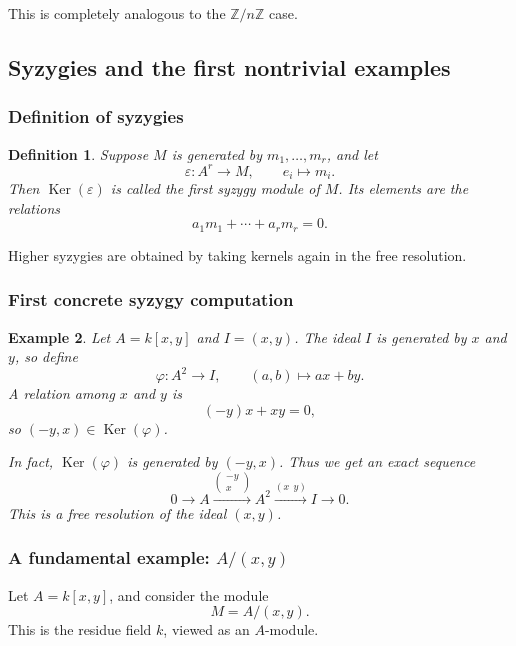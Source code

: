 \documentclass[12pt,a4paper]{article}
\theoremstyle{notespace}
\newtheorem{definition}{Definition}[section]
\newtheorem{example}[definition]{Example}
\newcommand{\kerf}{\operatorname{Ker}}
\newcommand{\ZZ}{\mathbb{Z}}
\begin{document}
This is completely analogous to the \(\ZZ/n\ZZ\) case.

\subsection{Syzygies and the first nontrivial examples}

\subsubsection{Definition of syzygies}

\begin{definition}
	Suppose \(M\) is generated by \(m_1,\dots,m_r\), and let
	\[
	\varepsilon:A^r\to M,\qquad e_i\mapsto m_i.
	\]
	Then \(\kerf(\varepsilon)\) is called the \emph{first syzygy module} of \(M\). Its elements are the relations
	\[
	a_1m_1+\cdots+a_rm_r=0.
	\]
\end{definition}

Higher syzygies are obtained by taking kernels again in the free resolution.

\subsubsection{First concrete syzygy computation}

\begin{example}
	Let \(A=k[x,y]\) and \(I=(x,y)\). The ideal \(I\) is generated by \(x\) and \(y\), so define
	\[
	\varphi:A^2\to I,\qquad (a,b)\mapsto ax+by.
	\]
	A relation among \(x\) and \(y\) is
	\[
	(-y)x + x y=0,
	\]
	so \((-y,x)\in \kerf(\varphi)\).
	
	In fact, \(\kerf(\varphi)\) is generated by \((-y,x)\). Thus we get an exact sequence
	\[
	0\longrightarrow A \xrightarrow{\begin{pmatrix}-y\\x\end{pmatrix}} A^2 \xrightarrow{(x\ \ y)} I \longrightarrow 0.
	\]
	This is a free resolution of the ideal \((x,y)\).
\end{example}

\subsubsection{A fundamental example: \(A/(x,y)\)}

Let \(A=k[x,y]\), and consider the module
\[
M=A/(x,y).
\]
This is the residue field \(k\), viewed as an \(A\)-module.
\end{document}
